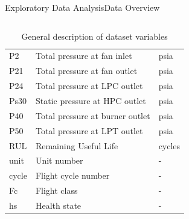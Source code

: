 \documentclass{beamer}
\begin{document}
\begin{frame}{Exploratory Data Analysis}{Data Overview}
\begin{columns}
\begin{column}{0.6\textwidth}
\begin{table}[!htbp]
{\begin{tabular}{ |l|l|l| }
                            P2 & Total pressure at fan inlet & psia \\
                            P21 & Total pressure at fan outlet & psia \\
                            P24 & Total pressure at LPC outlet & psia \\
                            Ps30 & Static pressure at HPC outlet & psia \\
                            P40 & Total pressure at burner outlet & psia \\
                            P50 & Total pressure at LPT outlet & psia \\
                            \hline
                            RUL & Remaining Useful Life & cycles \\
                            \hline
                            unit & Unit number & - \\
                            cycle & Flight cycle number & - \\
                            Fc & Flight class & - \\
                            hs & Health state & - \\
                            \hline
                        \end{tabular}}
                        \label{tab:dataset_info}
                        \caption{General description of dataset variables  \cite{phm-conference}}
                    \end{table}
                \end{column}
            \end{columns}

        \end{frame}

\end{document}
